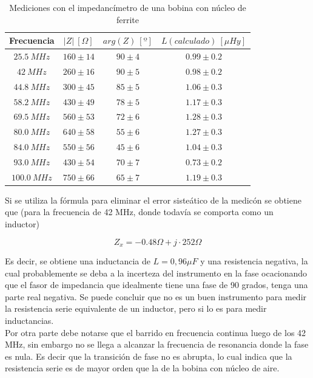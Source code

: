 \documentclass[a4paper,10pt]{article}
\begin{document}
		\begin{table}[!htp]
			\centering
			\begin{tabular}{|c|c|c|c|}
				\hline
				Frecuencia & $\left|Z\right|~[\Omega]$ & $arg(Z)~[º]$ & 
				$L (calculado)~[\mu Hy]$\\
				\hline
				$25.5~MHz$ & $160\pm14$ & $90\pm4$ & $0.99\pm0.2$ \\
				\hline
				$42~MHz$ & $260\pm16$ & $90\pm5$ & $0.98\pm0.2$\\
				\hline
				$44.8~MHz$ & $300\pm45$ & $85\pm5$ & $1.06\pm0.3$ \\
				\hline
				$58.2~MHz$ & $430\pm49$ & $78\pm5$ & $1.17\pm0.3$ \\
				\hline									
				$69.5~MHz$ & $560\pm53$ & $72\pm6$ & $1.28\pm0.3$ \\
				\hline									
				$80.0~MHz$& $640\pm58$ & $55\pm6$ & $1.27\pm0.3$ \\
				\hline									
				$84.0~MHz$ & $550\pm56$ & $45\pm6$ & $1.04\pm0.3$ \\
				\hline									
				$93.0~MHz$ & $430\pm54$ & $70\pm7$ & $0.73\pm0.2$ \\
				\hline									
				$100.0~MHz$ & $750\pm66$ & $65\pm7$ & $1.19\pm0.3$ \\
				\hline			
			\end{tabular}
			\caption{Mediciones con el impedanc\'imetro de una bobina con 
			n\'ucleo de ferrite} \label{tabIMPbobina}
		\end{table}	
		
		\indent Si se utiliza la f\'ormula para eliminar el error siste\'atico 
		de la medic\'on se obtiene que (para la frecuencia de 42 MHz, donde 
		todav\'ia se comporta como un inductor)
		
		$$Z_x=-0.48\Omega+j\cdot 252\Omega$$
		
		\indent Es decir, se obtiene una inductancia de $L=0,96 \mu F$ y una 
		resistencia negativa, la cual probablemente se deba a la incerteza del 
		instrumento en la fase ocacionando que el fasor de impedancia que 
		idealmente tiene una fase de 90 grados, tenga una parte real negativa. 
		Se puede concluir que no es un buen instrumento para medir la 
		resistencia serie equivalente de un inductor, pero si lo es para medir 
		inductancias. \\
		\indent Por otra parte debe notarse que el barrido en frecuencia 
		continua luego de los 42 MHz, sin embargo no se llega a alcanzar la 
		frecuencia de resonancia donde la fase es nula. Es decir que la 
		transici\'on de fase no es abrupta, lo cual indica que la resistencia 
		serie es de mayor orden que la de la bobina con n\'ucleo de aire. 
\end{document}

